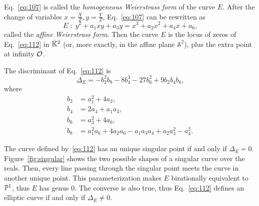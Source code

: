 Eq.~\eqref{eq:107} is called the \emph{homogeneous Weierstrass
  form} of the curve $E$.  After
the change of variables $x=\frac{X}{Z},y=\frac{Y}{Z}$,
Eq.~\eqref{eq:107} can be rewritten as
\begin{equation}
  \label{eq:112}
  E\;:\;y^2 + a_1xy + a_3y = x^3 + a_2x^2 + a_4x + a_6
  \text{,}
\end{equation}
called the \emph{affine Weierstrass
  form}. Then the curve $E$ is the
locus of zeros of Eq.~\eqref{eq:112} in $\bar{\mathbb{K}}^2$ (or, more
exactly, in the affine plane $\mathbb{A}^2$), plus the extra point at
infinity $\mathcal{O}$.

The discriminant of
Eq.~\eqref{eq:112} is
\begin{equation}
  \label{eq:118}
  \Delta_E = -b_2^2b_8-8b_4^3-27b_6^2+9b_2b_4b_6
  \text{,}
\end{equation}
where
\begin{equation}
  \label{eq:117}
  \begin{aligned}
    b_2 &= a_1^2 + 4a_2\text{,}\\
    b_4 &= 2a_4 + a_1a_3\text{,}\\
    b_6 &= a_3^2 + 4a_6\text{,}\\
    b_8 &= a_1^2a_6+4a_2a_6-a_1a_3a_4+a_2a_3^2-a_4^2\text{.}
  \end{aligned}
\end{equation}

\begin{remark}
  The curve defined by~\eqref{eq:112} has an unique singular point if
  and only if $\Delta_E=0$.  Figure~\ref{fig:singular} shows the two
  possible shapes of a singular curve over the reals. Then, every line
  passing through the singular point meets the curve in another unique
  point. This parameterization makes $E$ birationally equivalent to
  $\mathbb{P}^1$, thus $E$ has genus $0$. The converse is also true, thus
  Eq.~\eqref{eq:112} defines an elliptic curve if and only if
  $\Delta_E\ne0$.
\end{remark}


